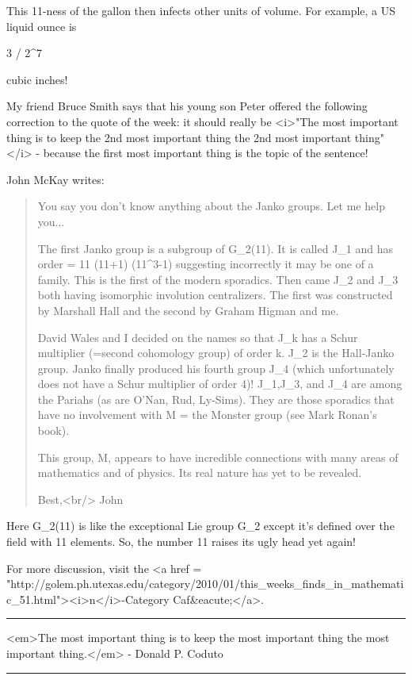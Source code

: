 This 11-ness of the gallon then infects other units of volume.
For example, a US liquid ounce is 

3   / 2^{7}

cubic inches!  

My friend Bruce Smith says that his young son Peter offered the
following correction to the quote of the week: it should really be
<i>"The most important thing is to keep the 2nd most important
thing the 2nd most important thing"</i> - because the first most
important thing is the topic of the sentence!

John McKay writes:

\begin{quote}

   You say you don't know anything about the Janko groups. Let me 
   help you...

   The first Janko group is a subgroup of G_{2}(11). It is
   called J_{1} and has order = 11 \times  (11+1) \times 
   (11^{3}-1) suggesting incorrectly it may be one of a
   family.  This is the first of the modern sporadics. Then came
   J_{2} and J_{3} both having isomorphic involution
   centralizers. The first was constructed by Marshall Hall and the
   second by Graham Higman and me.

   David Wales and I decided on the names so that J_{k} has a
   Schur multiplier (=second cohomology group) of order k.
   J_{2} is the Hall-Janko group.  Janko finally produced his
   fourth group J_{4} (which unfortunately does not have a
   Schur multiplier of order 4)!  J_{1},J_{3}, and
   J_{4} are among the Pariahs (as are O'Nan, Rud, Ly-Sims).
   They are those sporadics that have no involvement with M = the
   Monster group (see Mark Ronan's book).

   This group, M, appears to have incredible connections with many
   areas of mathematics and of physics. Its real nature has yet to be
   revealed.

   Best,<br/>
   John
\end{quote}

Here G_{2}(11) is like the exceptional Lie group G_{2}
except it's defined over the field with 11 elements.  So, the number
11 raises its ugly head yet again!

For more discussion, visit the <a href = "http://golem.ph.utexas.edu/category/2010/01/this_weeks_finds_in_mathematic_51.html"><i>n</i>-Category Caf&eacute;</a>.

\par\noindent\rule{\textwidth}{0.4pt}
<em>The most important thing is to keep the most important thing the most
important thing.</em> - Donald P. Coduto

\par\noindent\rule{\textwidth}{0.4pt}

